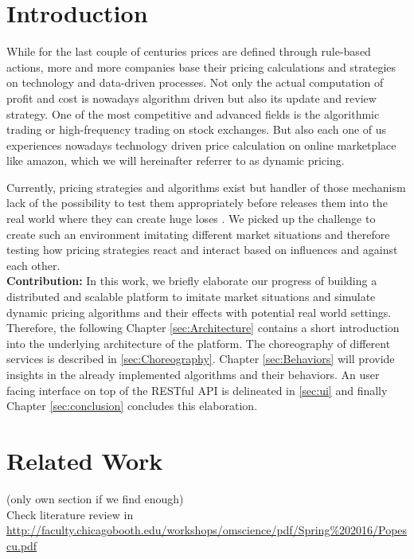 %
\section{Introduction}
%
While for the last couple of centuries prices are defined through rule-based actions, more and more companies base their pricing calculations and strategies on technology and data-driven processes. Not only the actual computation of profit and cost is nowadays algorithm driven but also its update and review strategy.
One of the most competitive and advanced fields is the algorithmic trading or high-frequency trading on stock exchanges. But also each one of us experiences nowadays technology driven price calculation on online marketplace like amazon, which we will hereinafter referrer to as dynamic pricing. 

Currently, pricing strategies and algorithms exist but handler of those mechanism lack of the possibility to test them appropriately before releases them into the real world where they can create huge loses \citep{uflacker2016ertragsmanagement} \citep{schlosser2016optimal} \citep{schlosser2016stochastic} \citep{schlosser2016survive}. We picked up the challenge to create such an environment imitating different market situations and therefore testing how pricing strategies react and interact based on influences and against each other.\\

\textbf{Contribution:} In this work, we briefly elaborate our progress of building a distributed and scalable platform to imitate market situations and simulate dynamic pricing algorithms and their effects with potential real world settings.
Therefore, the following Chapter \ref{sec:Architecture} contains a short introduction into the underlying architecture of the platform.
The choreography of different services is described in \ref{sec:Choreography}. Chapter \ref{sec:Behaviors} will provide insights in the already implemented algorithms and their behaviors.
An user facing interface on top of the RESTful API is delineated in \ref{sec:ui} and finally Chapter \ref{sec:conclusion} concludes this elaboration. \\


%
\section{Related Work}
%
(only own section if we find enough) \\

Check literature review in \url{http://faculty.chicagobooth.edu/workshops/omscience/pdf/Spring%202016/Popescu.pdf}